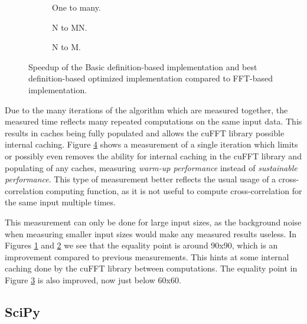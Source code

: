 \begin{figure}[ht]
	\centering	

	\begin{subfigure}{0.4\textwidth}
		\centering
		\def\svgwidth{\textwidth}
		
		\caption{One to many.}
		\label{fig:fft_startup_one_to_many}
	\end{subfigure}
	\begin{subfigure}{0.4\textwidth}
		\centering
		\def\svgwidth{\textwidth}
		
		\caption{N to MN.}
		\label{fig:fft_startup_n_to_mn}
	\end{subfigure}
	\begin{subfigure}{0.4\textwidth}
		\centering
		\def\svgwidth{\textwidth}
		
		\caption{N to M.}
		\label{fig:fft_startup_n_to_m}
	\end{subfigure}
	\caption{Speedup of the Basic definition-based implementation and best definition-based optimized implementation compared to FFT-based implementation.}
	\label{fig:fft_startup}
\end{figure}

Due to the many iterations of the algorithm which are measured together, the measured time reflects many repeated computations on the same input data. This results in caches being fully populated and allows the cuFFT library possible internal caching. Figure \ref{fig:fft_startup} shows a measurement of a single iteration which limits or possibly even removes the ability for internal caching in the cuFFT library and populating of any caches, measuring \textit{warm-up performance} instead of \textit{sustainable performance}. This type of measurement better reflects the usual usage of a cross-correlation computing function, as it is not useful to compute cross-correlation for the same input multiple times.

This measurement can only be done for large input sizes, as the background noise when measuring smaller input sizes would make any measured results useless. In Figures \ref{fig:fft_startup_one_to_many} and \ref{fig:fft_startup_n_to_mn} we see that the equality point is around 90x90, which is an improvement compared to previous measurements. This hints at some internal caching done by the cuFFT library between computations. The equality point in Figure \ref{fig:fft_startup_n_to_m} is also improved, now just below 60x60.

\subsection{SciPy}

